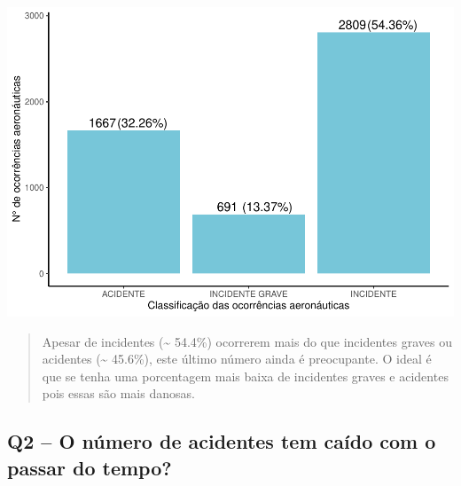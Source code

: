 \documentclass[
]{article}
\begin{document}
\begin{center}\includegraphics{4.Relatorio/pdf/index_files/figure-latex/unnamed-chunk-18-1} \end{center}

\begin{quote}
Apesar de incidentes (\textasciitilde{} 54.4\%) ocorrerem mais do que
incidentes graves ou acidentes (\textasciitilde{} 45.6\%), este último
número ainda é preocupante. O ideal é que se tenha uma porcentagem mais
baixa de incidentes graves e acidentes pois essas são mais danosas.
\end{quote}

\hypertarget{q2-o-nuxfamero-de-acidentes-tem-cauxeddo-com-o-passar-do-tempo}{%
\subsection{Q2 -- O número de acidentes tem caído com o passar do
tempo?}\label{q2-o-nuxfamero-de-acidentes-tem-cauxeddo-com-o-passar-do-tempo}}
\end{document}
